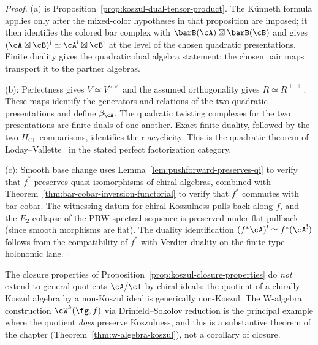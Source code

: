 \begin{proof}
\textup{(a)} is Proposition~\ref{prop:koszul-dual-tensor-product}.
The K\"unneth formula applies only after the mixed-color hypotheses in
that proposition are imposed; it then identifies the colored bar
complex with $\barB(\cA)\boxtimes\barB(\cB)$ and gives
$(\cA \boxtimes \cB)^{\mathrm i}\simeq
\cA^{\mathrm i}\boxtimes\cB^{\mathrm i}$ at the level of the chosen
quadratic presentations. Finite duality gives the quadratic dual
algebra statement; the chosen pair maps transport it to the partner
algebras.

\textup{(b)}: Perfectness gives $V\simeq V^{\vee\vee}$ and the assumed
orthogonality gives $R\simeq R^{\perp\perp}$.  These maps identify the
generators and relations of the two quadratic presentations and define
$\beta_\cA$.  The quadratic twisting complexes for the two
presentations are finite duals of one another.  Exact finite duality,
followed by the two $H_{\mathrm{CL}}$ comparisons, identifies their
acyclicity.  This is the quadratic theorem of
Loday--Vallette~\cite[Theorem~3.4.6]{LV12} in the stated perfect
factorization category.

\textup{(c)}: Smooth base change uses
Lemma~\ref{lem:pushforward-preserves-qi} to verify that
$f^*$ preserves quasi-isomorphisms of chiral algebras, combined
with Theorem~\ref{thm:bar-cobar-inversion-functorial} to verify
that $f^*$ commutes with bar-cobar. The witnessing datum for
chiral Koszulness pulls back along $f$, and the
$E_2$-collapse of the PBW spectral sequence is preserved under
flat pullback (since smooth morphisms are flat). The duality
identification $(f^*\cA)^! \simeq f^*(\cA^!)$ follows from the
compatibility of $f^*$ with Verdier duality on the finite-type
holonomic lane.
\end{proof}

\begin{remark}
\label{rem:koszul-closure-not-quotients}
The closure properties of
Proposition~\ref{prop:koszul-closure-properties} do \emph{not} extend
to general quotients $\cA / \cI$ by chiral ideals: the quotient of a
chirally Koszul algebra by a non-Koszul ideal is generically non-Koszul.
The W-algebra construction $\cW^k(\fg, f)$ via Drinfeld--Sokolov
reduction is the principal example where the quotient \emph{does}
preserve Koszulness, and this is a substantive theorem of the chapter
(Theorem~\ref{thm:w-algebra-koszul}), not a corollary of closure.
\end{remark}


